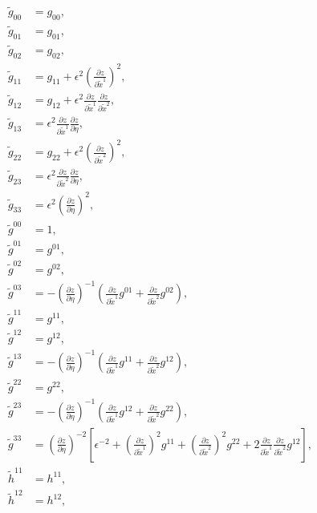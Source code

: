 \documentclass{article}
\begin{document}
\begin{align}
\tilde{g}_{00}&=g_{00}, \\
\tilde{g}_{01}&=g_{01}, \\
\tilde{g}_{02}&=g_{02}, \\
\tilde{g}_{11}&=g_{11} + \epsilon^2 \left( \frac{\partial z}{\partial \tilde{x}^1} \right)^2, \\
\tilde{g}_{12}&=g_{12} + \epsilon^2 \frac{\partial z}{\partial \tilde{x}^1} \frac{\partial z}{\partial \tilde{x}^2}, \\
\tilde{g}_{13}&=\epsilon^2 \frac{\partial z}{\partial \tilde{x}^1} \frac{\partial z}{\partial \eta}, \\
\tilde{g}_{22}&=g_{22} + \epsilon^2 \left( \frac{\partial z}{\partial \tilde{x}^2} \right)^2, \\
\tilde{g}_{23}&=\epsilon^2 \frac{\partial z}{\partial \tilde{x}^2} \frac{\partial z}{\partial \eta}, \\
\tilde{g}_{33}&=\epsilon^2 \left( \frac{\partial z}{\partial \eta} \right)^2, \\
\tilde{g}^{00}&=1, \\
\tilde{g}^{01}&=g^{01}, \\
\tilde{g}^{02}&=g^{02}, \\
\tilde{g}^{03}&=-\left( \frac{\partial z}{\partial \eta} \right)^{-1} \left( \frac{\partial z}{\partial \tilde{x}^1} g^{01} + \frac{\partial z}{\partial \tilde{x}^2} g^{02} \right), \\
\tilde{g}^{11}&=g^{11}, \\
\tilde{g}^{12}&=g^{12}, \\
\tilde{g}^{13}&=-\left( \frac{\partial z}{\partial \eta} \right)^{-1} \left( \frac{\partial z}{\partial \tilde{x}^1} g^{11} + \frac{\partial z}{\partial \tilde{x}^2} g^{12} \right), \\
\tilde{g}^{22}&=g^{22}, \\
\tilde{g}^{23}&=-\left( \frac{\partial z}{\partial \eta} \right)^{-1} \left( \frac{\partial z}{\partial \tilde{x}^1} g^{12} + \frac{\partial z}{\partial \tilde{x}^2} g^{22} \right), \\
\tilde{g}^{33}&=\left( \frac{\partial z}{\partial \eta} \right)^{-2} \left[ \epsilon^{-2} + \left( \frac{\partial z}{\partial \tilde{x}^1} \right)^2 g^{11} + \left( \frac{\partial z}{\partial \tilde{x}^2} \right)^2 g^{22} +2\frac{\partial z}{\partial \tilde{x}^1} \frac{\partial z}{\partial \tilde{x}^2} g^{12}\right], \\
\tilde{h}^{11}&=h^{11}, \\
\tilde{h}^{12}&=h^{12}, \\

\end{align}
\end{document}
